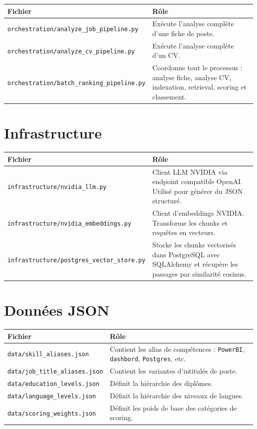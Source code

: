 \documentclass[12pt,a4paper]{report}
\begin{document}
\begin{longtable}{|p{5cm}|p{9cm}|}
\hline
\textbf{Fichier} & \textbf{Rôle} \\
\hline
\endhead
\texttt{orchestration/analyze\_job\_pipeline.py} & Exécute l'analyse complète d'une fiche de poste. \\
\hline
\texttt{orchestration/analyze\_cv\_pipeline.py} & Exécute l'analyse complète d'un CV. \\
\hline
\texttt{orchestration/batch\_ranking\_pipeline.py} & Coordonne tout le processus : analyse fiche, analyse CV, indexation, retrieval, scoring et classement. \\
\hline
\end{longtable}

\section{Infrastructure}

\begin{longtable}{|p{5cm}|p{9cm}|}
\hline
\textbf{Fichier} & \textbf{Rôle} \\
\hline
\endhead
\texttt{infrastructure/nvidia\_llm.py} & Client LLM NVIDIA via endpoint compatible OpenAI. Utilisé pour générer du JSON structuré. \\
\hline
\texttt{infrastructure/nvidia\_embeddings.py} & Client d'embeddings NVIDIA. Transforme les chunks et requêtes en vecteurs. \\
\hline
\texttt{infrastructure/postgres\_vector\_store.py} & Stocke les chunks vectorisés dans PostgreSQL avec SQLAlchemy et récupère les passages par similarité cosinus. \\
\hline
\end{longtable}

\section{Données JSON}

\begin{longtable}{|p{5cm}|p{9cm}|}
\hline
\textbf{Fichier} & \textbf{Rôle} \\
\hline
\endhead
\texttt{data/skill\_aliases.json} & Contient les alias de compétences : \texttt{PowerBI}, \texttt{dashbord}, \texttt{Postgres}, etc. \\
\hline
\texttt{data/job\_title\_aliases.json} & Contient les variantes d'intitulés de poste. \\
\hline
\texttt{data/education\_levels.json} & Définit la hiérarchie des diplômes. \\
\hline
\texttt{data/language\_levels.json} & Définit la hiérarchie des niveaux de langues. \\
\hline
\texttt{data/scoring\_weights.json} & Définit les poids de base des catégories de scoring. \\
\hline
\end{longtable}
\end{document}
